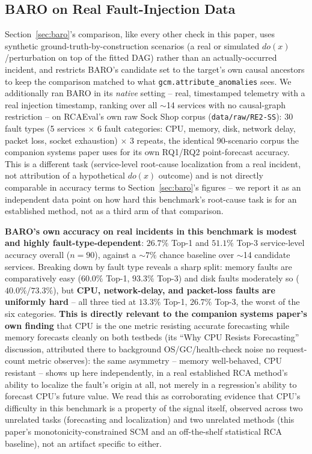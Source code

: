 \documentclass[journal, 10pt]{IEEEtran}
\begin{document}
\subsection{BARO on Real Fault-Injection Data}
\label{sec:baro-real}
Section~\ref{sec:baro}'s comparison, like every other check in this paper, uses synthetic ground-truth-by-construction scenarios (a real or simulated $do(x)$/perturbation on top of the fitted DAG) rather than an actually-occurred incident, and restricts BARO's candidate set to the target's own causal ancestors to keep the comparison matched to what \texttt{gcm.attribute\_anomalies} sees. We additionally ran BARO in its \emph{native} setting -- real, timestamped telemetry with a real injection timestamp, ranking over all $\sim$14 services with no causal-graph restriction -- on RCAEval's own raw Sock Shop corpus (\texttt{data/raw/RE2-SS}): 30 fault types (5 services $\times$ 6 fault categories: CPU, memory, disk, network delay, packet loss, socket exhaustion) $\times$ 3 repeats, the identical 90-scenario corpus the companion systems paper uses for its own RQ1/RQ2 point-forecast accuracy. This is a different task (service-level root-cause localization from a real incident, not attribution of a hypothetical $do(x)$ outcome) and is not directly comparable in accuracy terms to Section~\ref{sec:baro}'s figures -- we report it as an independent data point on how hard this benchmark's root-cause task is for an established method, not as a third arm of that comparison.

\textbf{BARO's own accuracy on real incidents in this benchmark is modest and highly fault-type-dependent}: $26.7\%$ Top-1 and $51.1\%$ Top-3 service-level accuracy overall ($n=90$), against a $\sim$$7\%$ chance baseline over $\sim$14 candidate services. Breaking down by fault type reveals a sharp split: memory faults are comparatively easy ($60.0\%$ Top-1, $93.3\%$ Top-3) and disk faults moderately so ($40.0\%$/$73.3\%$), but \textbf{CPU, network-delay, and packet-loss faults are uniformly hard} -- all three tied at $13.3\%$ Top-1, $26.7\%$ Top-3, the worst of the six categories. \textbf{This is directly relevant to the companion systems paper's own finding} that CPU is the one metric resisting accurate forecasting while memory forecasts cleanly on both testbeds (its ``Why CPU Resists Forecasting'' discussion, attributed there to background OS/GC/health-check noise no request-count metric observes): the same asymmetry -- memory well-behaved, CPU resistant -- shows up here independently, in a real established RCA method's ability to localize the fault's origin at all, not merely in a regression's ability to forecast CPU's future value. We read this as corroborating evidence that CPU's difficulty in this benchmark is a property of the signal itself, observed across two unrelated tasks (forecasting and localization) and two unrelated methods (this paper's monotonicity-constrained SCM and an off-the-shelf statistical RCA baseline), not an artifact specific to either.
\end{document}
